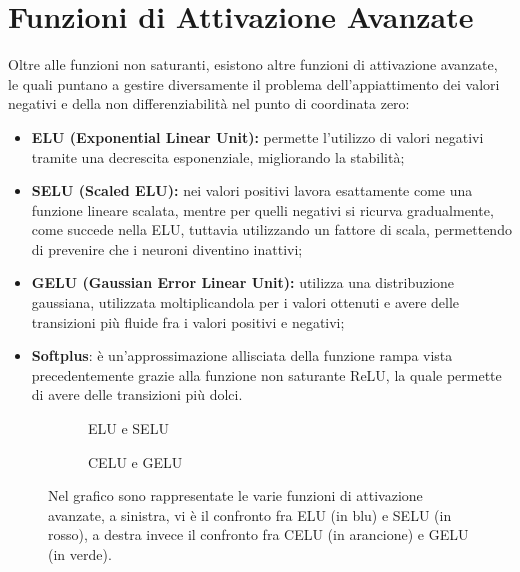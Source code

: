 \section{Funzioni di Attivazione Avanzate}
Oltre alle funzioni non saturanti, esistono altre funzioni di attivazione avanzate, le quali puntano a gestire diversamente il problema dell'appiattimento dei valori negativi e della non differenziabilità nel punto di coordinata zero:
\begin{itemize}
    \item \textbf{ELU (Exponential Linear Unit):} permette l'utilizzo di valori negativi tramite una decrescita esponenziale, migliorando la stabilità;
    \item \textbf{SELU (Scaled ELU):} nei valori positivi lavora esattamente come una funzione lineare scalata, mentre per quelli negativi si ricurva gradualmente, come succede nella ELU, tuttavia utilizzando un fattore di scala, permettendo di prevenire che i neuroni diventino inattivi;
    \item \textbf{GELU (Gaussian Error Linear Unit):} utilizza una distribuzione gaussiana, utilizzata moltiplicandola per i valori ottenuti e avere delle transizioni più fluide fra i valori positivi e negativi;
    \item \textbf{Softplus}: è un'approssimazione allisciata della funzione rampa vista precedentemente grazie alla funzione non saturante ReLU, la quale permette di avere delle transizioni più dolci.
\end{itemize}

\begin{figure}[h]
    \begin{subfigure}{0.35\textwidth}
        \caption{ELU e SELU}
    \end{subfigure}
    \qquad\qquad\quad
    \begin{subfigure}{0.35\textwidth}
        \caption{CELU e GELU}
    \end{subfigure}
    \caption{Nel grafico sono rappresentate le varie funzioni di attivazione avanzate, a sinistra, vi è il confronto fra ELU (in blu) e SELU (in rosso), a destra invece il confronto fra CELU (in arancione) e GELU (in verde).}
\end{figure}

